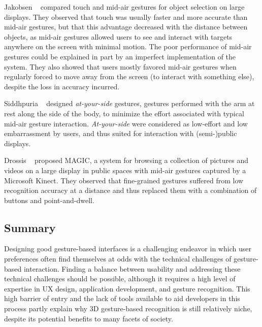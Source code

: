 Jakobsen \etal~\cite{Jakobsen:2015} compared touch and mid-air gestures for object selection on large displays. They observed that touch was usually faster and more accurate than mid-air gestures, but that this advantage decreased with the distance between objects, as mid-air gestures allowed users to see and interact with targets anywhere on the screen with minimal motion. The poor performance of mid-air gestures could be explained in part by an imperfect implementation of the system. They also showed that users mostly favored mid-air gestures when regularly forced to move away from the screen (\eg to interact with something else), despite the loss in accuracy incurred.

Siddhpuria \etal~\cite{Siddhpuria:2017} designed \textit{at-your-side} gestures, \ie gestures performed with the arm at rest along the side of the body, to minimize the effort associated with typical mid-air gesture interaction. \textit{At-your-side} were considered as low-effort and low embarrassment by users, and thus suited for interaction with (semi-)public displays.

Drossis \etal~\cite{Drossis:2013} proposed MAGIC, a system for browsing a collection of pictures and videos on a large display in public spaces with mid-air gestures captured by a Microsoft Kinect. They observed that fine-grained gestures suffered from low recognition accuracy at a distance and thus replaced them with a combination of buttons and point-and-dwell.

\subsection{Summary} \label{sec:state_of_the_art:overview:summary}
Designing good gesture-based interfaces is a challenging endeavor in which user preferences often find themselves at odds with the technical challenges of gesture-based interaction. Finding a balance between usability and addressing these technical challenges should be possible, although it requires a high level of expertise in UX design, application development, and gesture recognition. This high barrier of entry and the lack of tools available to aid developers in this process partly explain why 3D gesture-based recognition is still relatively niche, despite its potential benefits to many facets of society.


